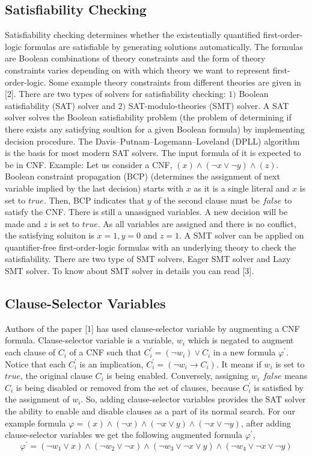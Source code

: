 \subsection{Satisfiability Checking}
Satisfiability checking determines whether the existentially quantified first-order-logic formulas are satisfiable by generating solutions automatically. The formulas are Boolean combinations of theory constraints and the form of theory constraints varies depending on with which theory we want to represent first-order-logic. Some example theory constraints from different theories are given in [2]. There are two types of solvers for satisfiability checking: $1)$ Boolean satisfiability (SAT) solver and $2)$ SAT-modulo-theories (SMT) solver.\newline
A SAT solver solves the Boolean satisfiability problem (the problem of determining if there exists any satisfying soultion for a given Boolean formula) by implementing decision procedure. The Davis–Putnam–Logemann–Loveland (DPLL) algorithm is the basis for most modern SAT solvers. The input formula of it is expected to be in CNF.\newline
Example: Let us consider a CNF, $(x) \wedge (\neg x\vee\neg y) \wedge (z)$. Boolean constraint propagation (BCP) (determines the assignment of next variable implied by the last decision) starts with $x$ as it is a single literal and $x$ is set to $true$. Then, BCP indicates that  $y$ of the second clause must be $false$ to satisfy the CNF. There is still a unassigned variables. A new decision will be made and $z$ is set to $true$. As all variables are assigned and there is no conflict, the satisfying soluiton is $x=1, y=0$ and $z=1$.\newline
A SMT solver can be applied on quantifier-free first-order-logic formulas with an underlying theory to check the satisfiability. There are two type of SMT solvers, Eager SMT solver and Lazy SMT solver. To know about SMT solver in details you can read [3].
\subsection{Clause-Selector Variables}
Authors of the paper [1] has used clause-selector variable by augmenting a CNF formula. Clause-selector variable is a variable, $w_{i}$ which is negated to augment each clause of $C_{i}$ of a CNF such that $C^{\prime}_{i}=(\neg w_{i})\vee C_{i}$ in a new formula $\varphi^{\prime}$. Notice that each $C^{\prime}_{i}$ is an implication, $C^{\prime}_{i}=(\neg w_{i}\rightarrow C_{i})$. It means if $w_{i}$ is set to $true$, the original clause $C_{i}$ is being enabled. Conversely, assigning $w_{i}$ $false$ means $C_{i}$ is being disabled or removed from the set of clauses, because $C^{\prime}_{i}$ is satisfied by the assignment of $w_{i}$. So, adding clause-selector variables provides the SAT solver the ability to enable and disable clauses as a part of its normal search.\newline
For our example formula $\varphi=(x)\wedge(\neg x)\wedge(\neg x\vee y)\wedge(\neg x \vee \neg y)$, after adding clause-selector variables we get the following augmented formula $\varphi^{\prime}$, 
$$\varphi^{\prime}=(\neg w_{1}\vee x)\wedge(\neg w_{2}\vee \neg x)\wedge(\neg w_{3}\vee \neg x\vee y)\wedge(\neg w_{4}\vee \neg x \vee \neg y)$$

